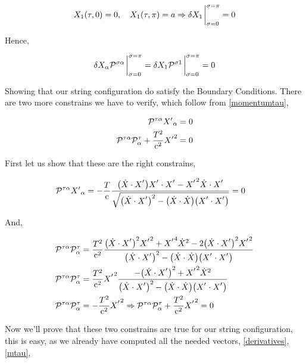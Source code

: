 \begin{align*}
    X_1\qty(\tau,0)=0,\ \ \ X_1\qty(\tau,\pi)=a\Rightarrow \delta X_1\eval_{\sigma=0}^{\sigma=\pi}=0
\end{align*}

Hence,

\begin{align*}
    \delta X_\alpha\mathcal P^{\sigma\alpha}\eval_{\sigma=0}^{\sigma=\pi}=\delta X_1\mathcal P^{\sigma1}\eval_{\sigma=0}^{\sigma=\pi}=0
\end{align*}

Showing that our string configuration do satisfy the Boundary Conditions. There are two more constrains we have to verify, which follow from \ref{momentumtau},

\begin{align*}
    \mathcal P^{\tau\alpha}{X'}_\alpha&=0\\
    \mathcal P^{\tau\alpha}\mathcal P^{\tau}_\alpha+\frac{T^2}{\textnormal{c}^2}{X'}^2&=0
\end{align*}

First let us show that these are the right constrains,

\begin{align*}
    \mathcal P^{\tau\alpha}{X'}_\alpha&=-\frac{T}{\luz}\frac{\qty(\dot X\cdot X^\sidev){X^\sidev\cdot X^\sidev}-{X^\sidev}^2{\dot X\cdot X^\sidev}}{\sqrt{\qty(\dot X\cdot X^\sidev)^2- \qty(\dot X\cdot \dot X)\qty(X^\sidev\cdot X^\sidev) }}=0
\end{align*}

And,

\begin{align*}
    \mathcal P^{\tau\alpha}\mathcal P^{\tau}_\alpha&=\frac{T^2}{\luz^2}\frac{\qty(\dot X\cdot X^\sidev)^2{X^\sidev}^2+{X^\sidev}^4{\dot X}^2-2\qty(\dot X\cdot X^\sidev)^2{X^\sidev}^2}{\qty(\dot X\cdot X^\sidev)^2- \qty(\dot X\cdot \dot X)\qty(X^\sidev\cdot X^\sidev) }\\
    \mathcal P^{\tau\alpha}\mathcal P^{\tau}_\alpha&=\frac{T^2}{\luz^2}{X^\sidev}^2\frac{-\qty(\dot X\cdot X^\sidev)^2+{X^\sidev}^2{\dot X}^2}{\qty(\dot X\cdot X^\sidev)^2- \qty(\dot X\cdot \dot X)\qty(X^\sidev\cdot X^\sidev) }\\
    \mathcal P^{\tau\alpha}\mathcal P^{\tau}_\alpha&=-\frac{T^2}{\luz^2}{X^\sidev}^2\Rightarrow \mathcal P^{\tau\alpha}\mathcal P^{\tau}_\alpha+\frac{T^2}{\luz^2}{X^\sidev}^2=0
\end{align*}

Now we'll prove that these two constrains are true for our string configuration, this is easy, as we already have computed all the 
needed vectors, \ref{derivatives},\ref{mtau},

